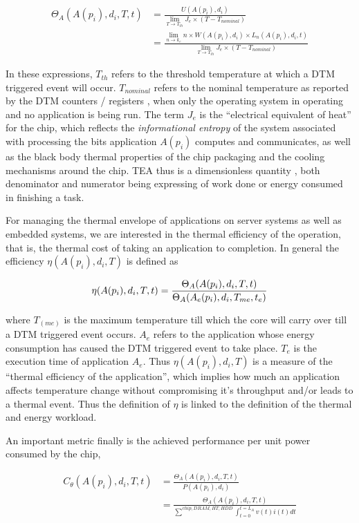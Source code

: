 \documentclass[11pt]{amsart}
\begin{document}
\begin{align*}
\Theta_A(A(p_i),d_i, T, t) &= \frac{U(A(p_i),d_i)}{\displaystyle \lim_{T \to T_{th}} J_e \times (T - T_{nominal})}  \\
					      &= \frac{\displaystyle \lim_{n \to k_e }n \times W(A(p_i),d_i) \times L_n(A(p_i),d_i,t)}{\displaystyle \lim_{T \to T_{th}} J_e \times (T - T_{nominal})} 
\end{align*}

In these expressions, $T_{th}$ refers to the threshold temperature at which a DTM triggered event will occur.  $T_{nominal}$ refers to the nominal temperature as reported by the DTM counters / registers , when only the operating system in operating and no application is being run. 
The term $J_e$ is the ``electrical equivalent of heat'' for the chip, which reflects the \textit{informational entropy} of the system associated with processing the bits application $A(p_i)$ computes and communicates, as well as the black body thermal properties of the chip packaging and the cooling mechanisms around the chip. TEA thus is a dimensionless quantity , both denominator and numerator being expressing of work done or energy consumed in finishing a task.

For managing the thermal envelope of applications on server systems as well as embedded systems, we are interested in the thermal efficiency of the operation, that is, the thermal cost of taking an application to completion. In general the efficiency $\eta(A(p_i), d_i,T)$ is defined as

\[
\eta(A(p_i), d_i,T, t) = \frac{\Theta_A(A(p_i),d_i, T, t)}{\Theta_A(A_e(p_i),d_i, T_{me}, t_e)} \\
\]

where $T_(me)$ is the maximum temperature till which the core will carry over till a DTM triggered event occurs. $A_e$ refers to the application whose energy consumption has caused the DTM triggered event to take place. $T_e$ is the execution time of application $A_e$. Thus $\eta(A(p_i), d_i,T)$ is a measure of the ``thermal efficiency of the application'', which implies how much an application affects temperature change without compromising it's throughput and/or leads to a thermal event. Thus the definition of $\eta$ is linked to the definition of the thermal and energy workload. 

An important metric finally is the achieved performance per unit power consumed by the chip, 

\begin{align*}
C_{\theta}(A(p_i), d_i, T, t) &= \frac{\Theta_A(A(p_i),d_i, T, t)}{P(A(p_i),d_i)} \\
	             			 &= \frac{\Theta_A(A(p_i),d_i, T, t)}{\displaystyle \sum^{chip,DRAM,HT,HDD} \int_{t=0}^{t=L_A}v(t)i(t)dt} 
\end{align*}
\end{document}
